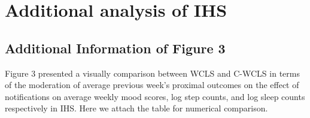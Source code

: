 \documentclass[supplementary, lineno]{biometrika}
\begin{document}
\section{Additional analysis of IHS}
\label{app:IHSadditionalanalysis}

\subsection{Additional Information of Figure 3}
\label{app:moreonFigure3}

Figure 3 presented a visually comparison between WCLS and C-WCLS in terms of the moderation of average previous week's proximal outcomes on the effect of notifications on average weekly mood scores, log step counts, and log sleep counts respectively in IHS. Here we attach the table for numerical comparison. 
\end{document}
